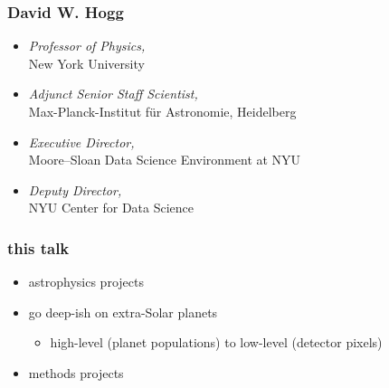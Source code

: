 \documentclass{beamer}
\begin{document}
\begin{frame}
  \frametitle{David W. Hogg}
  \begin{itemize}
  \item \textsl{Professor of Physics,}\\ New York University
  \item \textsl{Adjunct Senior Staff Scientist,}\\ Max-Planck-Institut f\"ur Astronomie, Heidelberg
  \item \textsl{Executive Director,}\\ Moore--Sloan Data Science Environment at NYU
  \item \textsl{Deputy Director,}\\ NYU Center for Data Science
  \end{itemize}
\end{frame}

\begin{frame}
  \frametitle{this talk}
  \begin{itemize}
  \item astrophysics projects
  \item go deep-ish on extra-Solar planets
    \begin{itemize}
    \item high-level (planet populations) to low-level (detector pixels)
    \end{itemize}
  \item methods projects
  \end{itemize}
\end{frame}
\end{document}
